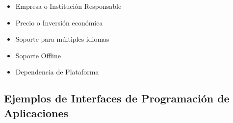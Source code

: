 \begin{itemize}
	\item Empresa o Instituci\'on Responsable
	\item Precio o Inversi\'on econ\'omica
	\item Soporte para m\'ultiples idiomas
	\item Soporte Offline
	\item Dependencia de Plataforma
\end{itemize}


\subsection{Ejemplos de Interfaces de Programaci\'on de Aplicaciones}







